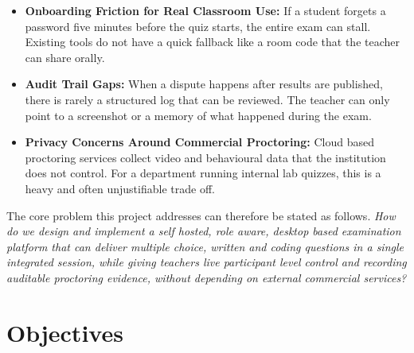 \documentclass[12pt, a4paper]{report}
\begin{document}
\begin{justify}
{\begin{itemize}
        \item \textbf{Onboarding Friction for Real Classroom Use:} If a student forgets a password five minutes before the quiz starts, the entire exam can stall. Existing tools do not have a quick fallback like a room code that the teacher can share orally.

        \item \textbf{Audit Trail Gaps:} When a dispute happens after results are published, there is rarely a structured log that can be reviewed. The teacher can only point to a screenshot or a memory of what happened during the exam.

        \item \textbf{Privacy Concerns Around Commercial Proctoring:} Cloud based proctoring services collect video and behavioural data that the institution does not control. For a department running internal lab quizzes, this is a heavy and often unjustifiable trade off.
    \end{itemize}

    The core problem this project addresses can therefore be stated as follows. \textit{How do we design and implement a self hosted, role aware, desktop based examination platform that can deliver multiple choice, written and coding questions in a single integrated session, while giving teachers live participant level control and recording auditable proctoring evidence, without depending on external commercial services?}
  }
\end{justify}

\section{Objectives}
\end{document}
